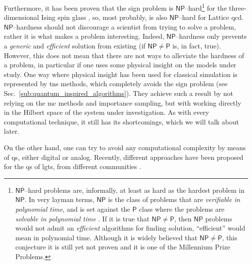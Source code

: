 Furthermore, it has been proven that the sign problem is $\mathsf{NP}$--hard\footnote{
    $\mathsf{NP}$--hard problems are, informally, at least as hard as the hardest problem in $\mathsf{NP}$.
    In very layman terms, $\mathsf{NP}$ is the class of problems that are \emph{verifiable in polynomial time}, and is set against the $\mathsf{P}$ class where the problems are \emph{solvable in polynomial time} \cite{arora2009computational}.
    If it is true that $\mathsf{NP} \neq \mathsf{P}$, then $\mathsf{NP}$ problems would not admit an \emph{efficient} algorithms for finding solution, ``efficient'' would mean in polynomial time.
    Although it is widely believed that $\mathsf{NP} \neq \mathsf{P}$, this conjecture it is still yet not proven and it is one of the Millennium Prize Problems.
}
for the three-dimensional Ising spin glass \cite{troyer2005fermionioc}, so, most probably, is also $\mathsf{NP}$--hard for Lattice \ac{qcd}.
$\mathsf{NP}$--hardness should not discourage a scientist from trying to solve a problem, rather it is what makes a problem interesting.
Indeed, $\mathsf{NP}$--hardness only prevents a \emph{generic} and \emph{efficient} solution from existing (if $\mathsf{NP} \neq \mathsf{P}$ is, in fact, true).
However, this does not mean that there are not ways to alleviate the hardness of a problem, in particular if one uses some physical insight on the models under study.
One way where physical insight has been used for classical simulation is represented by \acp{tn} methods, which completely avoids the sign problem (see Sec.~\ref{sub:quantum_inspired_algorithms}).
They achieve such a result by not relying on the \ac{mc} methods and importance sampling, but with working directly in the Hilbert space of the system under investigation.
As with every computational technique, it still has its shortcomings, which we will talk about later.

On the other hand, one can try to avoid any computational complexity by means of \ac{qs}, either digital or analog.
Recently, different approaches have been proposed for the \ac{qs} of \ac{lgt}s, from different communities \cite{banuls2020lgtreview, dalmonte2016lgtreview, banuls2020simulating}.

